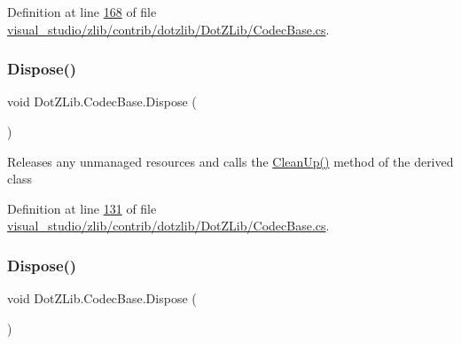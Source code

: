 Definition at line \hyperlink{visual__studio_2zlib_2contrib_2dotzlib_2_dot_z_lib_2_codec_base_8cs_source_l00168}{168} of file \hyperlink{visual__studio_2zlib_2contrib_2dotzlib_2_dot_z_lib_2_codec_base_8cs_source}{visual\+\_\+studio/zlib/contrib/dotzlib/\+Dot\+Z\+Lib/\+Codec\+Base.\+cs}.

\mbox{\label{class_dot_z_lib_1_1_codec_base_ab4bdcee97631d9e80d2bceb01d01f368}} 
\subsubsection{\texorpdfstring{Dispose()}{Dispose()}\hspace{0.1cm}{\footnotesize\ttfamily [1/2]}}
{\footnotesize\ttfamily void Dot\+Z\+Lib.\+Codec\+Base.\+Dispose (\begin{DoxyParamCaption}{ }\end{DoxyParamCaption})\hspace{0.3cm}{\ttfamily [inline]}}



Releases any unmanaged resources and calls the \hyperlink{class_dot_z_lib_1_1_codec_base_aa0ded075105c5cf6f5f0d61928c90ca6}{Clean\+Up()} method of the derived class 



Definition at line \hyperlink{visual__studio_2zlib_2contrib_2dotzlib_2_dot_z_lib_2_codec_base_8cs_source_l00131}{131} of file \hyperlink{visual__studio_2zlib_2contrib_2dotzlib_2_dot_z_lib_2_codec_base_8cs_source}{visual\+\_\+studio/zlib/contrib/dotzlib/\+Dot\+Z\+Lib/\+Codec\+Base.\+cs}.

\mbox{\label{class_dot_z_lib_1_1_codec_base_ab4bdcee97631d9e80d2bceb01d01f368}} 
\subsubsection{\texorpdfstring{Dispose()}{Dispose()}\hspace{0.1cm}{\footnotesize\ttfamily [2/2]}}
{\footnotesize\ttfamily void Dot\+Z\+Lib.\+Codec\+Base.\+Dispose (\begin{DoxyParamCaption}{ }\end{DoxyParamCaption})\hspace{0.3cm}{\ttfamily [inline]}}



